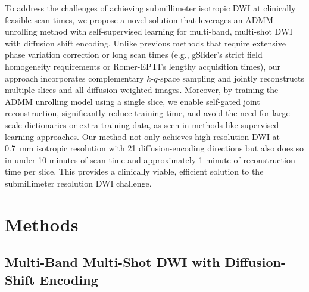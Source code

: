 \documentclass[AMA,STIX2COL,Linenumberson]{MRM}
\begin{document}
To address the challenges of achieving submillimeter isotropic DWI at clinically feasible scan times, 
we propose a novel solution that leverages an ADMM unrolling method with self-supervised learning 
for multi-band, multi-shot DWI with diffusion shift encoding. 
Unlike previous methods that require extensive phase variation correction or long scan times 
(e.g., gSlider’s strict field homogeneity requirements or Romer-EPTI’s lengthy acquisition times), 
our approach incorporates complementary $k$-$q$-space sampling and 
jointly reconstructs multiple slices and all diffusion-weighted images. 
Moreover, by training the ADMM unrolling model using a single slice, 
we enable self-gated joint reconstruction, significantly reduce training time, 
and avoid the need for large-scale dictionaries or extra training data, 
as seen in methods like supervised learning approaches. 
Our method not only achieves high-resolution DWI at \SI{0.7}{\milli\meter} isotropic resolution 
with 21 diffusion-encoding directions but also does so in under 10 minutes of scan time 
and approximately 1 minute of reconstruction time per slice. 
This provides a clinically viable, efficient solution to the submillimeter resolution DWI challenge.


\section{Methods}\label{SEC:METHODS}

\subsection{Multi-Band Multi-Shot DWI with Diffusion-Shift Encoding}
\end{document}
